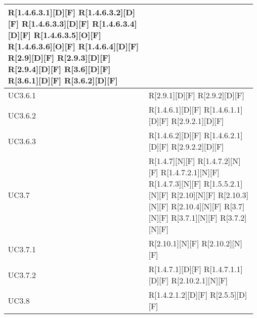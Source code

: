 \begin{longtable}{X | X}
R[1.4.6.3.1][D][F] \newline
R[1.4.6.3.2][D][F] \newline
R[1.4.6.3.3][D][F] \newline
R[1.4.6.3.4][D][F] \newline
R[1.4.6.3.5][O][F] \newline
R[1.4.6.3.6][O][F] \newline
R[1.4.6.4][D][F] \newline
R[2.9][D][F] \newline
R[2.9.3][D][F] \newline
R[2.9.4][D][F] \newline
R[3.6][D][F] \newline
R[3.6.1][D][F] \newline
R[3.6.2][D][F]  \\
\hline
UC3.6.1 & R[2.9.1][D][F] \newline
R[2.9.2][D][F]  \\
\hline
UC3.6.2 & R[1.4.6.1][D][F] \newline
R[1.4.6.1.1][D][F] \newline
R[2.9.2.1][D][F]  \\
\hline
UC3.6.3 & R[1.4.6.2][D][F] \newline
R[1.4.6.2.1][D][F] \newline
R[2.9.2.2][D][F]  \\
\hline
UC3.7 & R[1.4.7][N][F] \newline
R[1.4.7.2][N][F] \newline
R[1.4.7.2.1][N][F] \newline
R[1.4.7.3][N][F] \newline
R[1.5.5.2.1][N][F] \newline
R[2.10][N][F] \newline
R[2.10.3][N][F] \newline
R[2.10.4][N][F] \newline
R[3.7][N][F] \newline
R[3.7.1][N][F] \newline
R[3.7.2][N][F]  \\
\hline
UC3.7.1 & R[2.10.1][N][F] \newline
R[2.10.2][N][F]  \\
\hline
UC3.7.2 & R[1.4.7.1][D][F] \newline
R[1.4.7.1.1][D][F] \newline
R[2.10.2.1][N][F]  \\
\hline
UC3.8 & R[1.4.2.1.2][D][F] \newline
R[2.5.5][D][F]  \\

\end{longtable}
